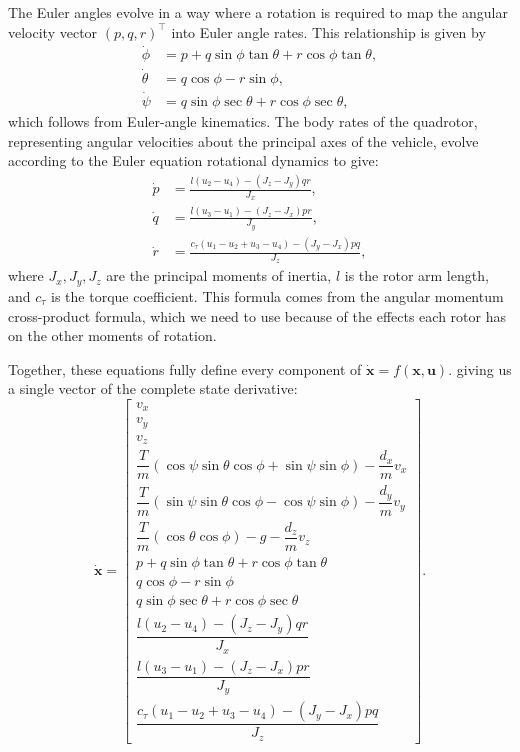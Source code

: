 \documentclass[11pt]{amsart}
\begin{document}
The Euler angles evolve in a way where a rotation is required to map the angular velocity vector 
$(p, q, r)^\top$ into Euler angle rates. This relationship is given by
\begin{align*}
\dot{\phi}   &= p + q\sin\phi\tan\theta + r\cos\phi\tan\theta, \\
\dot{\theta} &= q\cos\phi - r\sin\phi, \\
\dot{\psi}   &= q\sin\phi\sec\theta + r\cos\phi\sec\theta,
\end{align*}
which follows from Euler-angle kinematics. The body rates of the quadrotor, representing angular velocities about the principal axes of the vehicle, evolve according to the Euler equation rotational dynamics to give:
\begin{align*}
\dot{p} &= \frac{l(u_2 - u_4) - (J_z - J_y)qr}{J_x}, \\
\dot{q} &= \frac{l(u_3 - u_1) - (J_z - J_x)pr}{J_y}, \\
\dot{r} &= \frac{c_\tau(u_1 - u_2 + u_3 - u_4) - (J_y - J_x)pq}{J_z},
\end{align*}
where $J_x, J_y, J_z$ are the principal moments of inertia, $l$ is the rotor arm length, and $c_\tau$ is the torque coefficient. This formula comes from the angular momentum cross-product formula, which we need to use because of the effects each rotor has on the other moments of rotation.

Together, these equations fully define every component of $\dot{\mathbf{x}} = f(\mathbf{x}, \mathbf{u})$. 
giving us a single vector of the complete state derivative:
\[
\dot{\mathbf{x}} = \begin{bmatrix}
v_x \\
v_y \\
v_z \\
\dfrac{T}{m}(\cos\psi\sin\theta\cos\phi + \sin\psi\sin\phi) - \dfrac{d_x}{m}v_x \\[6pt]
\dfrac{T}{m}(\sin\psi\sin\theta\cos\phi - \cos\psi\sin\phi) - \dfrac{d_y}{m}v_y \\[6pt]
\dfrac{T}{m}(\cos\theta\cos\phi) - g - \dfrac{d_z}{m}v_z \\[6pt]
p + q\sin\phi\tan\theta + r\cos\phi\tan\theta \\
q\cos\phi - r\sin\phi \\
q\sin\phi\sec\theta + r\cos\phi\sec\theta \\[4pt]
\dfrac{l(u_2 - u_4) - (J_z - J_y)qr}{J_x} \\[8pt]
\dfrac{l(u_3 - u_1) - (J_z - J_x)pr}{J_y} \\[8pt]
\dfrac{c_\tau(u_1 - u_2 + u_3 - u_4) - (J_y - J_x)pq}{J_z}
\end{bmatrix}.
\]
\end{document}
